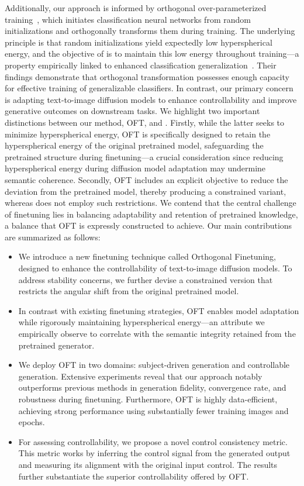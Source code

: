 Additionally, our approach is informed by orthogonal over-parameterized training~\cite{liu2021orthogonal}, which initiates classification neural networks from random initializations and orthogonally transforms them during training. The underlying principle is that random initializations yield expectedly low hyperspherical energy, and the objective of \cite{liu2021orthogonal} is to maintain this low energy throughout training—a property empirically linked to enhanced classification generalization~\cite{liu2018learning,lin2020regularizing}. Their findings demonstrate that orthogonal transformation possesses enough capacity for effective training of generalizable classifiers. In contrast, our primary concern is adapting text-to-image diffusion models to enhance controllability and improve generative outcomes on downstream tasks. We highlight two important distinctions between our method, OFT, and \cite{liu2021orthogonal}. Firstly, while the latter seeks to minimize hyperspherical energy, OFT is specifically designed to retain the hyperspherical energy of the original pretrained model, safeguarding the pretrained structure during finetuning—a crucial consideration since reducing hyperspherical energy during diffusion model adaptation may undermine semantic coherence. Secondly, OFT includes an explicit objective to reduce the deviation from the pretrained model, thereby producing a constrained variant, whereas \cite{liu2021orthogonal} does not employ such restrictions. We contend that the central challenge of finetuning lies in balancing adaptability and retention of pretrained knowledge, a balance that OFT is expressly constructed to achieve. Our main contributions are summarized as follows:

\begin{itemize}[leftmargin=*,nosep]

    \item We introduce a new finetuning technique called Orthogonal Finetuning, designed to enhance the controllability of text-to-image diffusion models. To address stability concerns, we further devise a constrained version that restricts the angular shift from the original pretrained model.
    \item In contrast with existing finetuning strategies, OFT enables model adaptation while rigorously maintaining hyperspherical energy—an attribute we empirically observe to correlate with the semantic integrity retained from the pretrained generator.
    \item We deploy OFT in two domains: subject-driven generation and controllable generation. Extensive experiments reveal that our approach notably outperforms previous methods in generation fidelity, convergence rate, and robustness during finetuning. Furthermore, OFT is highly data-efficient, achieving strong performance using substantially fewer training images and epochs.
    \item For assessing controllability, we propose a novel control consistency metric. This metric works by inferring the control signal from the generated output and measuring its alignment with the original input control. The results further substantiate the superior controllability offered by OFT.
\end{itemize}

